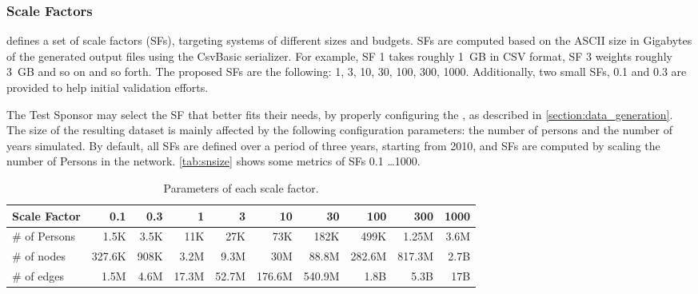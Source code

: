 \subsubsection{Scale Factors}

\ldbcsnb defines a set of scale factors (SFs), targeting systems of different sizes and budgets.
SFs are computed based on the ASCII size in Gigabytes of the generated output files using the CsvBasic serializer.
For example, SF 1 takes roughly 1~GB in CSV format, SF 3 weights roughly 3~GB and so on and so forth.
The proposed SFs are the following: 1, 3, 10, 30, 100, 300, 1000.
Additionally, two small SFs, 0.1 and 0.3 are provided to help initial validation efforts.

The Test Sponsor may select the SF that better fits their needs, by properly configuring the \datagen, as described in \autoref{section:data_generation}.
The size of the resulting dataset is mainly affected by the following configuration parameters: the number of persons and the number of years simulated.
By default, all SFs are defined over a period of three years, starting from 2010, and SFs are computed by scaling the number of Persons in the network.
\autoref{tab:snsize} shows some metrics of SFs 0.1 \ldots 1000.

\begin{table}[H]
    \centering
    \begin{tabular}{|l||r|r|r|r|r|r|r|r|r|}
        \hline
        Scale Factor     &     0.1 &     0.3 &        1 &        3 &        10 &        30 &        100 &        300 &        1000 \\ \hline\hline
        \# of Persons    &    1.5K &    3.5K &      11K &      27K &       73K &      182K &       499K &      1.25M &        3.6M \\ \hline\hline
        \# of nodes      &  327.6K &    908K &     3.2M &     9.3M &       30M &     88.8M &     282.6M &     817.3M &        2.7B \\ \hline
        \# of edges      &    1.5M &    4.6M &    17.3M &    52.7M &    176.6M &    540.9M &       1.8B &       5.3B &         17B \\ \hline
    \end{tabular}
    \centering
    \caption{Parameters of each scale factor.}
    \label{tab:snsize}
\end{table}

